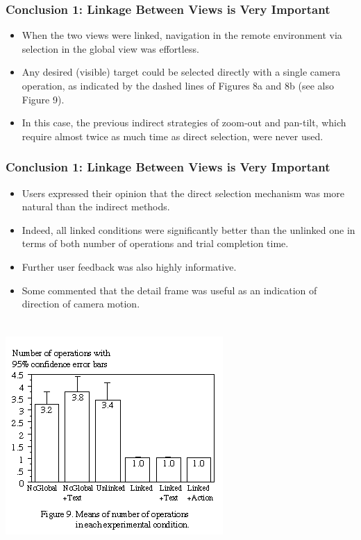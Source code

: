 \documentclass{beamer}
\begin{document}
\begin{frame}
\frametitle{Conclusion 1: Linkage Between Views is Very Important}

\begin{itemize}
\item When the two views were linked, navigation in the remote environment via selection in the global view was effortless.
\item Any desired (visible) target could be selected directly with a single camera operation, as indicated by the dashed lines of Figures 8a and 8b (see also Figure 9).
\item In this case, the previous indirect strategies of zoom-out and pan-tilt, which require almost twice as much time as direct selection, were never used.
\end{itemize}

\end{frame}

\begin{frame}
\frametitle{Conclusion 1: Linkage Between Views is Very Important}

\begin{itemize}
\item Users expressed their opinion that the direct selection mechanism was more natural than the indirect methods.
\item Indeed, all linked conditions were significantly better than the unlinked one in terms of both number of operations and trial completion time.
\item Further user feedback was also highly informative.
\item Some commented that the detail frame was useful as an indication of direction of camera motion.
\end{itemize}

\end{frame}

\begin{frame}
\frametitle{}


\begin{columns}

\centerline{\includegraphics[width=0.500000\linewidth,keepaspectratio]{ky_fg9.png}}

\end{columns}

\end{frame}
\end{document}
